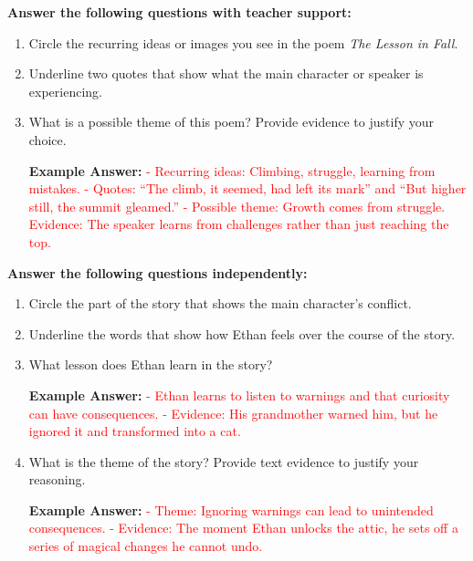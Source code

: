 \documentclass[12pt]{article}
\begin{document}
\begin{tcolorbox}[colframe=black!60, colback=white, 
coltitle=black, colbacktitle=black!15, fonttitle=\bfseries\Large, 
title=Guided Practice, halign title=center]
\textbf{Answer the following questions with teacher support:}
\begin{enumerate}
    \item Circle the recurring ideas or images you see in the poem \textit{The Lesson in Fall}.
    \item Underline two quotes that show what the main character or speaker is experiencing.
    \item What is a possible theme of this poem? Provide evidence to justify your choice.
    \vspace{3em}
    
    \textbf{Example Answer:}  
    \textcolor{red}{
    - Recurring ideas: Climbing, struggle, learning from mistakes.  
    - Quotes: “The climb, it seemed, had left its mark” and “But higher still, the summit gleamed.”  
    - Possible theme: Growth comes from struggle. Evidence: The speaker learns from challenges rather than just reaching the top.}
\end{enumerate}
\end{tcolorbox}

\vspace{1em}

\begin{tcolorbox}[colframe=black!60, colback=white, 
coltitle=black, colbacktitle=black!15, fonttitle=\bfseries\Large, 
title=Independent Practice, halign title=center]
\textbf{Answer the following questions independently:}
\begin{enumerate}
    \item Circle the part of the story that shows the main character's conflict.
    \item Underline the words that show how Ethan feels over the course of the story.
    \item What lesson does Ethan learn in the story?  
    \vspace{2em}
    
    \textbf{Example Answer:}  
    \textcolor{red}{
    - Ethan learns to listen to warnings and that curiosity can have consequences.  
    - Evidence: His grandmother warned him, but he ignored it and transformed into a cat.}
    
    \item What is the theme of the story? Provide text evidence to justify your reasoning.  
    \vspace{2em}
    
    \textbf{Example Answer:}  
    \textcolor{red}{
    - Theme: Ignoring warnings can lead to unintended consequences.  
    - Evidence: The moment Ethan unlocks the attic, he sets off a series of magical changes he cannot undo.}
\end{enumerate}
\end{tcolorbox}
\end{document}
